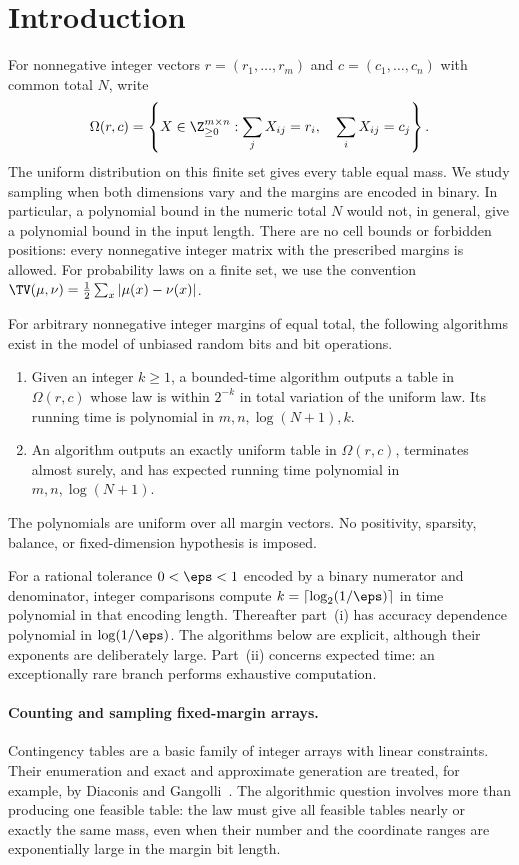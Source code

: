 \section{Introduction}\label{sec:introduction}

For nonnegative integer vectors $r=(r_1,\ldots,r_m)$ and
$c=(c_1,\ldots,c_n)$ with common total $N$, write
\[
 \Omega(r,c)=\left\{X\in\Z_{\ge0}^{m\times n}:
       \sum_jX_{ij}=r_i,\quad \sum_iX_{ij}=c_j\right\}.
\]
The uniform distribution on this finite set gives every table equal mass.
We study sampling when both dimensions vary and the margins are encoded
in binary. In particular, a polynomial bound in the numeric total $N$
would not, in general, give a polynomial bound in the input length.
There are no cell bounds or forbidden positions: every nonnegative integer
matrix with the prescribed margins is allowed. For probability laws on a
finite set, we use the convention
$\TV(\mu,\nu)=\tfrac12\sum_x|\mu(x)-\nu(x)|$.

\begin{theorem}\label{thm:main}
For arbitrary nonnegative integer margins of equal total, the following
algorithms exist in the model of unbiased random bits and bit operations.
\begin{enumerate}[label=\textup{(\roman*)}]
 \item Given an integer $k\ge1$, a bounded-time algorithm outputs a table
 in $\Omega(r,c)$ whose law is within $2^{-k}$ in total variation of the
 uniform law. Its running time is polynomial in
 $m,n,\log(N+1),k$.
 \item An algorithm outputs an exactly uniform table in $\Omega(r,c)$,
 terminates almost surely, and has expected running time polynomial in
 $m,n,\log(N+1)$.
\end{enumerate}
The polynomials are uniform over all margin vectors. No positivity,
sparsity, balance, or fixed-dimension hypothesis is imposed.
\end{theorem}

For a rational tolerance $0<\eps<1$ encoded by a binary numerator and
denominator, integer comparisons compute
$k=\lceil\log_2(1/\eps)\rceil$ in time polynomial in that encoding length.
Thereafter part~\textup{(i)} has accuracy dependence polynomial in
$\log(1/\eps)$.
The algorithms below are explicit, although their exponents are deliberately
large. Part~\textup{(ii)} concerns expected time: an exceptionally rare
branch performs exhaustive computation.

\paragraph{Counting and sampling fixed-margin arrays.}
Contingency tables are a basic family of integer arrays with linear
constraints. Their enumeration and exact and approximate generation are
treated, for example, by Diaconis and Gangolli~\cite{DiaconisGangolli1995}.
The algorithmic question involves more than producing one feasible table:
the law must give all feasible tables nearly or exactly the same mass,
even when their number and the coordinate ranges are exponentially large
in the margin bit length.

